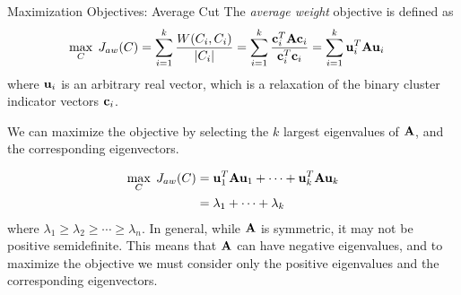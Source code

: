 

\begin{frame}{Maximization Objectives: Average Cut}
 The {\em average weight} objective is
def\/{i}ned as
\begin{align*}
    \max_{{\relax C}}\; J_{aw}({\relax C}) & =
    \sum_{i=1}^k {W(C_i,C_i) \over |C_i|} =
    \sum_{i=1}^k {\mathbf{c}^T_i \mathbf{A} \mathbf{c}_i
    \over \mathbf{c}_i^T\mathbf{c}_i}
	= \sum_{i=1}^k \mathbf{u}_i^T \mathbf{A} \mathbf{u}_i
\end{align*}
where $\mathbf{u}_i$ is an arbitrary real vector, which is a relaxation of the
binary cluster indicator vectors $\mathbf{c}_i$.

\medskip
We can maximize
the objective by selecting the $k$ largest eigenvalues of $\mathbf{A}$,
and the corresponding eigenvectors.

\begin{align*}
    \max_{{\relax C}} \; J_{aw}({\relax C}) &=
    \mathbf{u}^T_1 \mathbf{A} \mathbf{u}_1 + \dots + \mathbf{u}^T_k \mathbf{A} \mathbf{u}_k\\
    & = \lambda_1 + \dots + \lambda_k
\end{align*}
where $\lambda_1 \ge \lambda_2 \ge \cdots \ge \lambda_n$.
In general, while $\mathbf{A}$ is symmetric, it may not be 
positive semidef\/{i}nite. This means
that $\mathbf{A}$ can have negative eigenvalues, and to maximize the objective 
we must consider only the positive eigenvalues and the
corresponding eigenvectors.
\end{frame}

